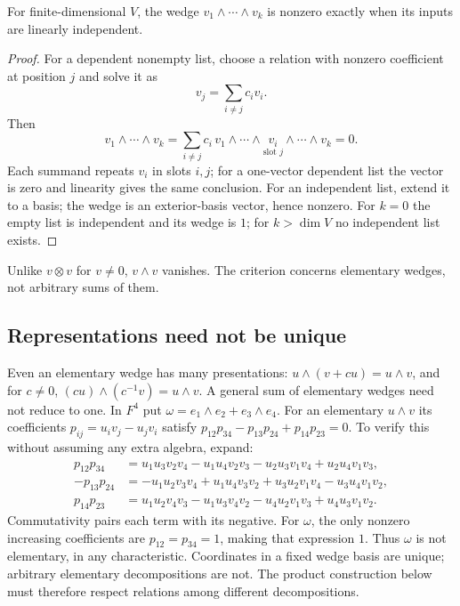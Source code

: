 \begin{proposition}\label{prop:wedge-nonvanishing}
For finite-dimensional $V$, the wedge $v_1\wedge\cdots\wedge v_k$ is
nonzero exactly when its inputs are linearly independent.
\end{proposition}
\begin{proof}
For a dependent nonempty list, choose a relation with nonzero coefficient
at position $j$ and solve it as
\[
v_j=\sum_{i\ne j}c_iv_i.
\]
 Then
\[
v_1\wedge\cdots\wedge v_k
=\sum_{i\ne j}c_i\,
v_1\wedge\cdots\wedge\underset{\text{slot }j}{v_i}\wedge\cdots\wedge v_k=0.
\]
Each summand repeats $v_i$ in slots $i,j$; for a one-vector dependent
list the vector is zero and linearity gives the same conclusion. For an independent list, extend it to a basis;
the wedge is an exterior-basis vector, hence nonzero. For $k=0$ the empty
list is independent and its wedge is $1$; for $k>\dim V$ no independent
list exists.
\end{proof}
Unlike $v\otimes v$ for $v\ne0$, $v\wedge v$ vanishes. The criterion
concerns elementary wedges, not arbitrary sums of them.

\subsection{Representations need not be unique}
Even an elementary wedge has many presentations:
$u\wedge(v+cu)=u\wedge v$, and for $c\ne0$,
$(cu)\wedge(c^{-1}v)=u\wedge v$. A general sum of elementary wedges
need not reduce to one. In $F^4$ put $\omega=e_1\wedge e_2+e_3\wedge e_4$.
For an elementary $u\wedge v$ its coefficients $p_{ij}=u_iv_j-u_jv_i$
satisfy $p_{12}p_{34}-p_{13}p_{24}+p_{14}p_{23}=0$. To verify this without
assuming any extra algebra, expand:
\begin{align*}
p_{12}p_{34}&=u_1u_3v_2v_4-u_1u_4v_2v_3-u_2u_3v_1v_4+u_2u_4v_1v_3,\\
-p_{13}p_{24}&=-u_1u_2v_3v_4+u_1u_4v_3v_2+u_3u_2v_1v_4-u_3u_4v_1v_2,\\
p_{14}p_{23}&=u_1u_2v_4v_3-u_1u_3v_4v_2-u_4u_2v_1v_3+u_4u_3v_1v_2.
\end{align*}
Commutativity pairs each term with its negative. For $\omega$, the only
nonzero increasing coefficients are $p_{12}=p_{34}=1$, making that
expression $1$. Thus $\omega$ is not elementary, in any characteristic.
Coordinates in a fixed wedge basis are unique; arbitrary elementary
decompositions are not. The product construction below must therefore
respect relations among different decompositions.

